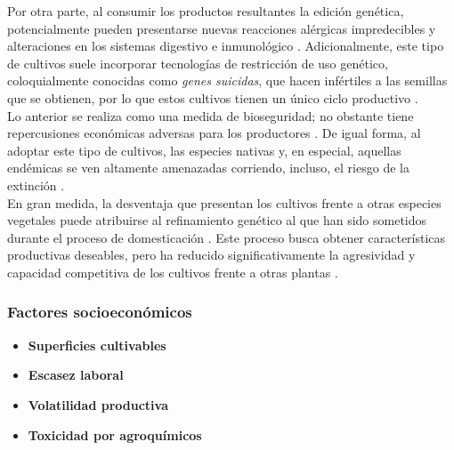 \begin{itemize}[leftmargin=0cm, itemsep=0.5 cm]
	
	Por otra parte, al consumir los productos resultantes la edición genética, potencialmente pueden presentarse nuevas reacciones alérgicas impredecibles y alteraciones en los sistemas digestivo e inmunológico \cite{Verma_2011}. Adicionalmente, este tipo de cultivos suele incorporar tecnologías de restricción de uso genético, coloquialmente conocidas como \textit{genes suicidas}, que hacen infértiles a las semillas que se obtienen, por lo que estos cultivos tienen un único ciclo productivo \cite{Daniell_2002}.\\
	
	
	Lo anterior se realiza como una medida de bioseguridad; no obstante tiene repercusiones económicas adversas para los productores \cite{VanAcker_2007}. De igual forma, al adoptar este tipo de cultivos, las especies nativas y, en especial, aquellas endémicas se ven altamente amenazadas corriendo, incluso, el riesgo de la extinción \cite{Kumar_2020}.\\
	
	
	En gran medida, la desventaja que presentan los cultivos frente a otras especies vegetales puede atribuirse al refinamiento genético al que han sido sometidos durante el proceso de domesticación \cite{Moreira_2018}. Este proceso busca obtener características productivas deseables, pero ha reducido significativamente la agresividad y capacidad competitiva de los cultivos frente a otras plantas \cite{DaSilva_2007, Concenco_2012}.
	
\end{itemize}





\subsubsection{Factores socioeconómicos}
\begin{itemize}[leftmargin=0cm, itemsep=0.5 cm]
\item[]\textbf{Superficies cultivables\\}
\item[]\textbf{Escasez laboral\\}
\item[]\textbf{Volatilidad productiva\\}
\item[]\textbf{Toxicidad por agroquímicos\\}
\end{itemize}

